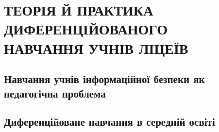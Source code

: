 


\clearpage

\section{\MakeUppercase{ТЕОРІЯ Й ПРАКТИКА ДИФЕРЕНЦІЙОВАНОГО НАВЧАННЯ УЧНІВ ЛІЦЕЇВ}}
\subsection{Навчання учнів інформаційної безпеки як педагогічна проблема\label{sec1.1}}



\subsection{Диференційоване навчання в середній освіті}

